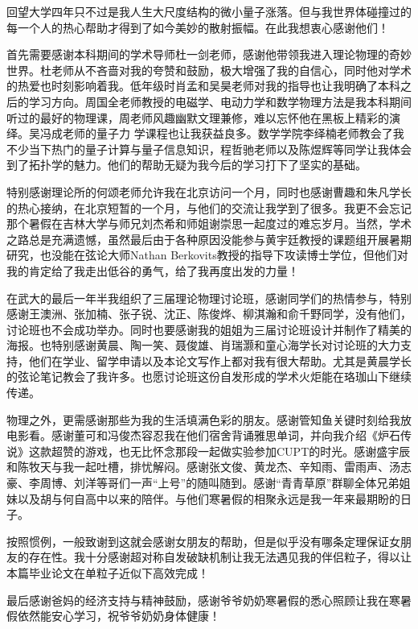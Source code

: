 \begin{acknowledgements}
	回望大学四年只不过是我人生大尺度结构的微小量子涨落。但与我世界体碰撞过的每一个人的热心帮助才得到了如今美妙的散射振幅。在此我想衷心感谢他们！
	
	首先需要感谢本科期间的学术导师杜一剑老师，感谢他带领我进入理论物理的奇妙世界。杜老师从不吝啬对我的夸赞和鼓励，极大增强了我的自信心，同时他对学术的热爱也时刻影响着我。低年级时肖孟和吴昊老师对我的指导也让我明确了本科之后的学习方向。周国全老师教授的电磁学、电动力学和数学物理方法是我本科期间听过的最好的物理课，周老师风趣幽默文理兼修，难以忘怀他在黑板上精彩的演绎。吴冯成老师的量子力 学课程也让我获益良多。数学学院李绎楠老师教会了我不少当下热门的量子计算与量子信息知识，程哲驰老师以及陈煜辉等同学让我体会到了拓扑学的魅力。他们的帮助无疑为我今后的学习打下了坚实的基础。
	
	特别感谢理论所的何颂老师允许我在北京访问一个月，同时也感谢曹趣和朱凡学长的热心接纳，在北京短暂的一个月，与他们的交流让我学到了很多。我更不会忘记那个暑假在吉林大学与师兄刘杰希和师姐谢崇思一起度过的难忘岁月。当然，学术之路总是充满遗憾，虽然最后由于各种原因没能参与黄宇廷教授的课题组开展暑期研究，也没能在弦论大师Nathan Berkovits教授的指导下攻读博士学位，但他们对我的肯定给了我走出低谷的勇气，给了我再度出发的力量！
	
	在武大的最后一年半我组织了三届理论物理讨论班，感谢同学们的热情参与，特别感谢王澳洲、张加楠、张子锐、沈正、陈俊烨、柳淇瀚和俞千野同学，没有他们，讨论班也不会成功举办。同时也要感谢我的姐姐为三届讨论班设计并制作了精美的海报。也特别感谢黄晨、陶一笑、聂俊雄、肖瑞灏和童心海学长对讨论班的大力支持，他们在学业、留学申请以及本论文写作上都对我有很大帮助。尤其是黄晨学长的弦论笔记教会了我许多。也愿讨论班这份自发形成的学术火炬能在珞珈山下继续传递。
	
	物理之外，更需感谢那些为我的生活填满色彩的朋友。感谢管知鱼关键时刻给我放电影看。感谢董可和冯俊杰容忍我在他们宿舍背诵雅思单词，并向我介绍《炉石传说》这款超赞的游戏，也无比怀念那段一起做实验参加CUPT的时光。感谢盛宇辰和陈牧天与我一起吐槽，排忧解闷。感谢张文俊、黄龙杰、辛知雨、雷雨声、汤志豪、李周博、刘洋等哥们一声“上号”的随叫随到。感谢“青青草原”群聊全体兄弟姐妹以及胡与何自高中以来的陪伴。与他们寒暑假的相聚永远是我一年来最期盼的日子。
	
	按照惯例，一般致谢到这就会感谢女朋友的帮助，但是似乎没有哪条定理保证女朋友的存在性。我十分感谢超对称自发破缺机制让我无法遇见我的伴侣粒子，得以让本篇毕业论文在单粒子近似下高效完成！
	
	最后感谢爸妈的经济支持与精神鼓励，感谢爷爷奶奶寒暑假的悉心照顾让我在寒暑假依然能安心学习，祝爷爷奶奶身体健康！
\end{acknowledgements}
